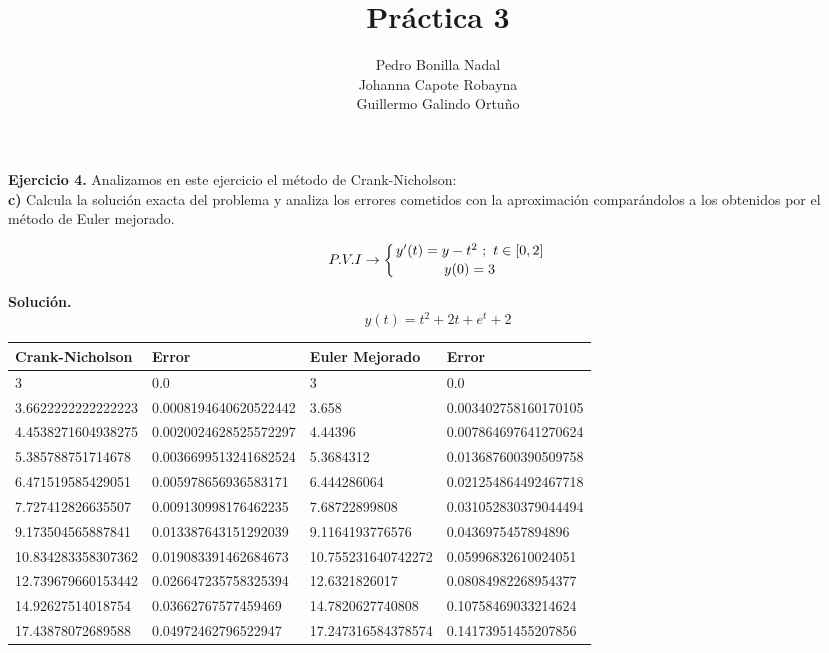 \documentclass[11pt]{article}
\title{\textbf{Práctica 3}}
\author{Pedro Bonilla Nadal\\
		Johanna Capote Robayna\\
		Guillermo Galindo Ortuño}
\date{}
\begin{document}
\maketitle

\textbf{Ejercicio 4.} Analizamos en este ejercicio el método de Crank-Nicholson: \\

\textbf{c)} Calcula la solución exacta del problema y analiza los errores cometidos con la aproximación comparándolos a los obtenidos por el método de Euler mejorado.

$$P.V.I  \rightarrow  \left\lbrace
y'(t) = y - t^2 \  ;\  t \in [0,2] \atop
y(0) = 3
\right. $$

\textbf{Solución.}
$$y(t) = t^2 + 2 t + e^t + 2$$

\begin{table}[h]
\centering

\begin{tabular}{|l|l|l|l|}
\hline
Crank-Nicholson           & Error                 & Euler Mejorado     & Error           \\ \hline
3                  & 0.0                   & 3                  & 0.0                    \\ \hline
3.6622222222222223 & 0.0008194640620522442 & 3.658              & 0.003402758160170105   \\ \hline
4.4538271604938275 & 0.0020024628525572297 & 4.44396            & 0.007864697641270624   \\ \hline
5.385788751714678  & 0.0036699513241682524 & 5.3684312          & 0.013687600390509758   \\ \hline
6.471519585429051  & 0.005978656936583171  & 6.444286064        & 0.021254864492467718   \\ \hline
7.727412826635507  & 0.009130998176462235  & 7.68722899808      & 0.031052830379044494   \\ \hline
9.173504565887841  & 0.013387643151292039  & 9.1164193776576    & 0.0436975457894896     \\ \hline
10.834283358307362 & 0.019083391462684673  & 10.755231640742272 & 0.05996832610024051    \\ \hline
12.739679660153442 & 0.026647235758325394  & 12.6321826017      & 0.08084982268954377    \\ \hline
14.92627514018754  & 0.03662767577459469   & 14.7820627740808   & 0.10758469033214624    \\ \hline
17.43878072689588  & 0.04972462796522947   & 17.247316584378574 & 0.14173951455207856    \\ \hline
\end{tabular}
\end{table}
\end{document}
